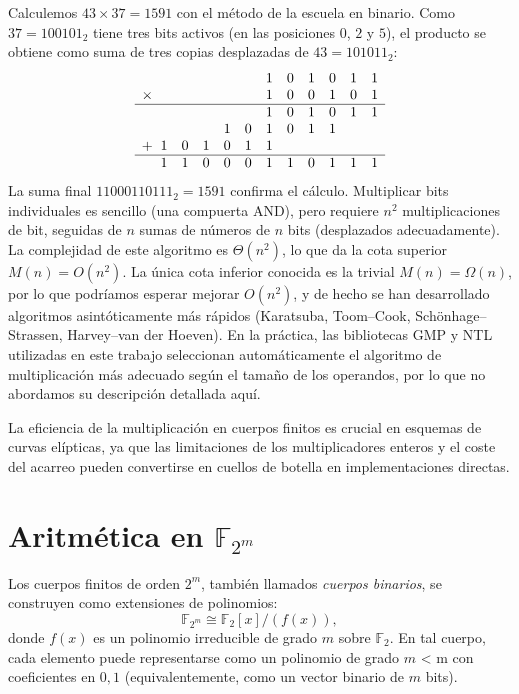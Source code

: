 Calculemos \(43\times37=1591\) con el método de la escuela en binario. Como \(37 = 100101_2\) tiene tres bits activos (en las posiciones \(0\), \(2\) y \(5\)), el producto se obtiene como suma de tres copias desplazadas de \(43 = 101011_2\):
\[
\begin{array}{l@{\;\;}*{11}{c}}
       &   &   &   &   &   & 1 & 0 & 1 & 0 & 1 & 1 \\
\times &   &   &   &   &   & 1 & 0 & 0 & 1 & 0 & 1 \\
\hline
       &   &   &   &   &   & 1 & 0 & 1 & 0 & 1 & 1 \\
       &   &   &   & 1 & 0 & 1 & 0 & 1 & 1 &   &   \\
+      & 1 & 0 & 1 & 0 & 1 & 1 &   &   &   &   &   \\
\hline
       & 1 & 1 & 0 & 0 & 0 & 1 & 1 & 0 & 1 & 1 & 1 \\
\end{array}
\]
La suma final \(11000110111_2 = 1591\) confirma el cálculo. Multiplicar bits individuales es sencillo (una compuerta AND), pero requiere \(n^2\) multiplicaciones de bit, seguidas de \(n\) sumas de números de \(n\) bits (desplazados adecuadamente). La complejidad de este algoritmo es \(\Theta(n^2)\), lo que da la cota superior \(M(n)=O(n^2)\). La única cota inferior conocida es la trivial \(M(n)=\Omega(n)\), por lo que podríamos esperar mejorar \(O(n^2)\), y de hecho se han desarrollado algoritmos asintóticamente más rápidos (Karatsuba, Toom--Cook, Schönhage--Strassen, Harvey--van der Hoeven). En la práctica, las bibliotecas GMP y NTL utilizadas en este trabajo seleccionan automáticamente el algoritmo de multiplicación más adecuado según el tamaño de los operandos, por lo que no abordamos su descripción detallada aquí.

La eficiencia de la multiplicación en cuerpos finitos es crucial en esquemas de curvas elípticas, ya que las limitaciones de los multiplicadores enteros y el coste del acarreo pueden convertirse en cuellos de botella en implementaciones directas.

\section{Aritmética en \texorpdfstring{$\mathbb{F}_{2^m}$}{F2m}}
\label{sec:aritmetica-f2m}
Los cuerpos finitos de orden $2^m$, también llamados \emph{cuerpos binarios}, se construyen como extensiones de polinomios:
\[
  \mathbb{F}_{2^m}\cong\mathbb{F}_2[x]/(f(x)),
\]
donde $f(x)$ es un polinomio irreducible de grado $m$ sobre $\mathbb{F}_2$.
En tal cuerpo, cada elemento puede representarse como un polinomio de grado \(m\) < m con coeficientes en ${0,1}$ (equivalentemente, como un vector binario de $m$ bits).

